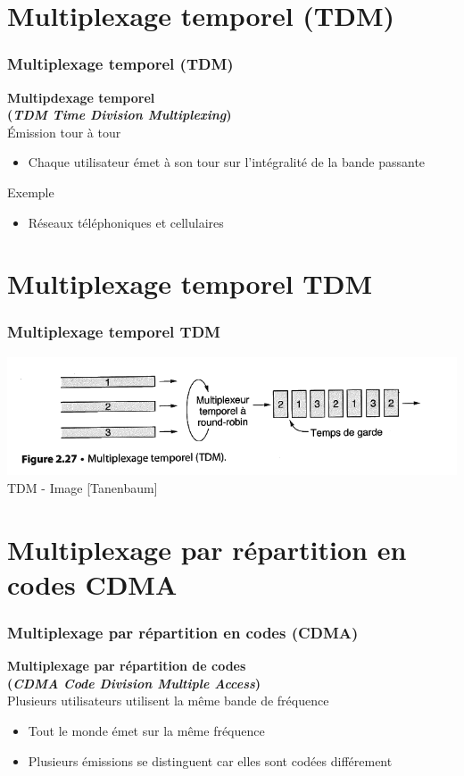 \section{Multiplexage temporel (TDM)}

\begin{frame}[fragile]
  \frametitle{Multiplexage temporel (TDM)}
{\bf\large Multipdexage temporel \\
(\textit{TDM Time Division Multiplexing})}\\
Émission tour à tour
\begin{itemize}
	\item Chaque utilisateur émet à son tour sur l'intégralité de la bande passante
\end{itemize}
\vspace{1cm}
Exemple
\begin{itemize}
	\item Réseaux téléphoniques et cellulaires
\end{itemize}
\end{frame}

\section{Multiplexage temporel TDM}

\begin{frame}[fragile]
  \frametitle{Multiplexage temporel TDM}
\begin{center}
	\includegraphics[width=.8\linewidth]{img/2-27.png}\\
	{\scriptsize TDM - Image [Tanenbaum]}
\end{center}
\end{frame}



\section{Multiplexage par répartition en codes CDMA}

\begin{frame}[fragile]
  \frametitle{Multiplexage par répartition en codes (CDMA)}
{\large\bf Multiplexage par répartition de codes \\
(\textit{CDMA Code Division Multiple Access})}\\
Plusieurs utilisateurs utilisent la même bande de fréquence
\begin{itemize}
	\item Tout le monde émet sur la même fréquence
	\item Plusieurs émissions se distinguent car elles sont codées différement
\end{itemize}
\end{frame}


